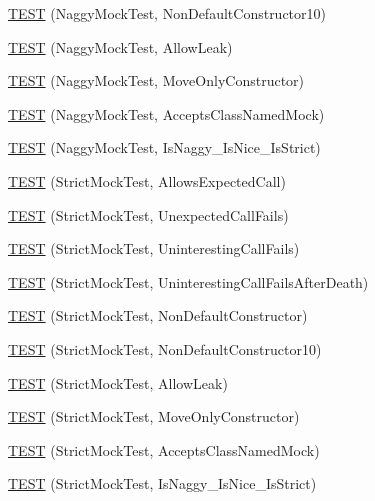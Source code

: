 \begin{DoxyCompactItemize}
\item 
\mbox{\hyperlink{namespacetesting_1_1gmock__nice__strict__test_a982de09f3040cc5b9f457a7aa4e00652}{T\+E\+ST}} (Naggy\+Mock\+Test, Non\+Default\+Constructor10)
\item 
\mbox{\hyperlink{namespacetesting_1_1gmock__nice__strict__test_abafc38649114354a5dc342524ca2102e}{T\+E\+ST}} (Naggy\+Mock\+Test, Allow\+Leak)
\item 
\mbox{\hyperlink{namespacetesting_1_1gmock__nice__strict__test_adffb618d5dacd53e35c05b2f16b91710}{T\+E\+ST}} (Naggy\+Mock\+Test, Move\+Only\+Constructor)
\item 
\mbox{\hyperlink{namespacetesting_1_1gmock__nice__strict__test_af147980581baec3cf492457c2d1e0276}{T\+E\+ST}} (Naggy\+Mock\+Test, Accepts\+Class\+Named\+Mock)
\item 
\mbox{\hyperlink{namespacetesting_1_1gmock__nice__strict__test_a59d1c771bd39f8c3831688a235a193e7}{T\+E\+ST}} (Naggy\+Mock\+Test, Is\+Naggy\+\_\+\+Is\+Nice\+\_\+\+Is\+Strict)
\item 
\mbox{\hyperlink{namespacetesting_1_1gmock__nice__strict__test_a269b7756fb785a84a609543700f77256}{T\+E\+ST}} (Strict\+Mock\+Test, Allows\+Expected\+Call)
\item 
\mbox{\hyperlink{namespacetesting_1_1gmock__nice__strict__test_ae58ab074e0f9218a727d1fec0793667e}{T\+E\+ST}} (Strict\+Mock\+Test, Unexpected\+Call\+Fails)
\item 
\mbox{\hyperlink{namespacetesting_1_1gmock__nice__strict__test_afea105507ce78fc0e2c20d9f4cca16d7}{T\+E\+ST}} (Strict\+Mock\+Test, Uninteresting\+Call\+Fails)
\item 
\mbox{\hyperlink{namespacetesting_1_1gmock__nice__strict__test_a04e9402fd03549e1eda88659b6eac174}{T\+E\+ST}} (Strict\+Mock\+Test, Uninteresting\+Call\+Fails\+After\+Death)
\item 
\mbox{\hyperlink{namespacetesting_1_1gmock__nice__strict__test_a21456158013d707a1238d0ade00ea3f6}{T\+E\+ST}} (Strict\+Mock\+Test, Non\+Default\+Constructor)
\item 
\mbox{\hyperlink{namespacetesting_1_1gmock__nice__strict__test_ae52f11a6045e9c307237cf02b85e6b79}{T\+E\+ST}} (Strict\+Mock\+Test, Non\+Default\+Constructor10)
\item 
\mbox{\hyperlink{namespacetesting_1_1gmock__nice__strict__test_a5f8498b9a90a81c4709b8d3ae968500e}{T\+E\+ST}} (Strict\+Mock\+Test, Allow\+Leak)
\item 
\mbox{\hyperlink{namespacetesting_1_1gmock__nice__strict__test_a2e8eee23ea869ebc5224e014b616d409}{T\+E\+ST}} (Strict\+Mock\+Test, Move\+Only\+Constructor)
\item 
\mbox{\hyperlink{namespacetesting_1_1gmock__nice__strict__test_a4534bdd7c8ca19aad56933d34e0ea4db}{T\+E\+ST}} (Strict\+Mock\+Test, Accepts\+Class\+Named\+Mock)
\item 
\mbox{\hyperlink{namespacetesting_1_1gmock__nice__strict__test_a79dd179124eda7c24cf55a6f128a97bc}{T\+E\+ST}} (Strict\+Mock\+Test, Is\+Naggy\+\_\+\+Is\+Nice\+\_\+\+Is\+Strict)
\end{DoxyCompactItemize}


